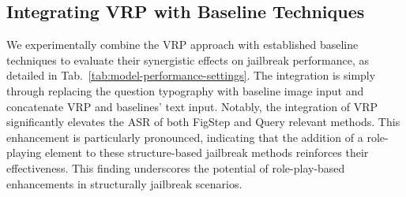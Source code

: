 \subsection{Integrating VRP with Baseline Techniques}\label{appendx:intergration}
We experimentally combine the VRP approach with established baseline techniques to evaluate their synergistic effects on jailbreak performance, as detailed in Tab.~\ref{tab:model-performance-settings}. The integration is simply through replacing the question typography with baseline image input and concatenate VRP and baselines' text input. Notably, the integration of VRP significantly elevates the ASR of both FigStep and Query relevant methods. This enhancement is particularly pronounced, indicating that the addition of a role-playing element to these structure-based jailbreak methods reinforces their effectiveness. This finding underscores the potential of role-play-based enhancements in structurally jailbreak scenarios.

